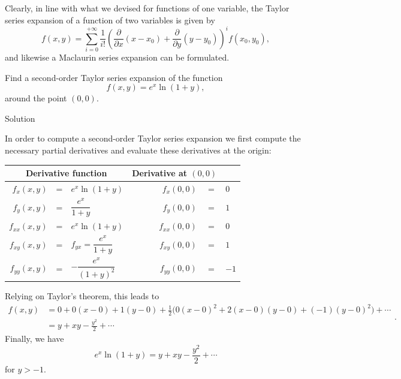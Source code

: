 Clearly, in line with what we devised for functions of one variable, the Taylor series expansion of a function of two variables is given by
$$
f(x,y) =\sum_{i=0}^{+\infty}\dfrac{1}{i!}\left(\dfrac{\partial}{\partial x}(x-x_0)+\dfrac{\partial}{\partial y}(y-y_0)\right)^i f(x_0,y_0),$$
and likewise a Maclaurin series expansion can be formulated.


\begin{example}
Find a second-order Taylor series expansion of the function
$$
\displaystyle f(x,y)=e^{x}\ln(1+y),
$$
around the point $(0, 0)$. 

Solution 

In order to compute a second-order Taylor series expansion we first compute the necessary partial derivatives and evaluate these derivatives at the origin:
\begin{center}
\renewcommand{\arraystretch}{1.5}
\begin{tabular}{rcl|crcl}
\multicolumn{3}{c}{Derivative function}&\multicolumn{3}{c}{Derivative at $(0,0)$}\\\hline
$f_{x}(x,y)$ & =&$e^{x}\ln(1+y)$& &$f_{x}(0,0)$& =&$0$\\[6pt]
$f_{y}(x,y) $& =& ${\dfrac {e^{x}}{1+y}}$&  &$f_{y}(0,0)$& =&$1$\\[6pt]
$f_{xx}(x,y)$& =& $e^{x}\ln(1+y)$&  & $f_{xx}(0,0)$&=&$0$\\[6pt]
$f_{xy}(x,y)$& =& $f_{yx} = {\dfrac {e^{x}}{1+y}}$ &  &$f_{xy}(0,0)$& =&$1$\\[6pt]
$f_{yy}(x,y)$& =& $-{\dfrac {e^{x}}{(1+y)^{2}}}$ &  &$f_{yy}(0,0)$& =&$ -1$
\end{tabular}
\renewcommand{\arraystretch}{1}
\end{center}



Relying on Taylor's theorem, this leads to
$$
\displaystyle {\begin{aligned}f(x,y)&=0+0(x-0)+1(y-0)+{\frac {1}{2}}{\Big (}0(x-0)^{2}+2(x-0)(y-0)+(-1)(y-0)^{2}{\Big )}+\cdots \\&=y+xy-{\frac {y^{2}}{2}}+\cdots \end{aligned}}.
$$
Finally, we have
$$
\displaystyle e^{x}\ln(1+y)=y+xy-{\frac {y^{2}}{2}}+\cdots
$$
for $y>-1$.


\end{example}



